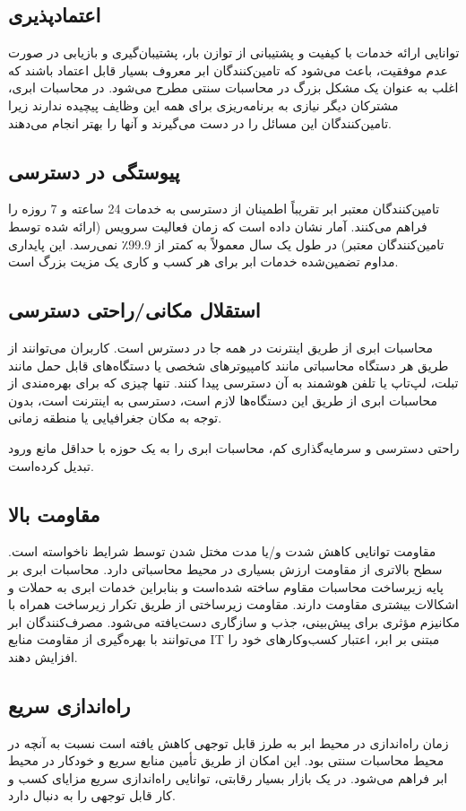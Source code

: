 \documentclass{book}
\begin{document}
    \subsection{اعتماد‌پذیری}
    توانایی ارائه خدمات با کیفیت و پشتیبانی از توازن بار، پشتیبان‌گیری و بازیابی در صورت عدم موفقیت، باعث می‌شود که تامین‌کنندگان ابر معروف بسیار قابل اعتماد باشند که اغلب به عنوان یک مشکل بزرگ در محاسبات سنتی مطرح می‌شود. در محاسبات ابری، مشترکان دیگر نیازی به برنامه‌ریزی برای همه این وظایف پیچیده ندارند زیرا تامین‌کنندگان این مسائل را در دست می‌گیرند و آنها را بهتر انجام می‌دهند.

    \subsection{پیوستگی در دسترسی}
    تامین‌کنندگان معتبر ابر تقریباً اطمینان از دسترسی به خدمات 24 ساعته و 7 روزه را فراهم می‌کنند. آمار نشان داده است که زمان فعالیت سرویس (ارائه شده توسط تامین‌کنندگان معتبر) در طول یک سال معمولاً به کمتر از 99.9٪ نمی‌رسد. این پایداری مداوم تضمین‌شده خدمات ابر برای هر کسب و کاری یک مزیت بزرگ است.

    \subsection{استقلال مکانی/راحتی دسترسی}
    محاسبات ابری از طریق اینترنت در همه جا در دسترس است. کاربران می‌توانند از طریق هر دستگاه محاسباتی مانند کامپیوترهای شخصی یا دستگاه‌های قابل حمل مانند تبلت، لپ‌تاپ یا تلفن هوشمند به آن دسترسی پیدا کنند. تنها چیزی که برای بهره‌مندی از محاسبات ابری از طریق این دستگاه‌ها لازم است، دسترسی به اینترنت است، بدون توجه به مکان جغرافیایی یا منطقه زمانی.

    راحتی دسترسی و سرمایه‌گذاری کم، محاسبات ابری را به یک حوزه با حداقل مانع ورود تبدیل کرده‌است.

    \subsection{مقاومت بالا}
    مقاومت توانایی کاهش شدت و/یا مدت مختل شدن توسط شرایط ناخواسته است. سطح بالاتری از مقاومت ارزش بسیاری در محیط محاسباتی دارد. محاسبات ابری بر پایه زیرساخت محاسبات مقاوم ساخته شده‌است و بنابراین خدمات ابری به حملات و اشکالات بیشتری مقاومت دارند. مقاومت زیرساختی از طریق تکرار زیرساخت همراه با مکانیزم مؤثری برای پیش‌بینی، جذب و سازگاری دست‌یافته می‌شود. مصرف‌کنندگان ابر می‌توانند با بهره‌گیری از مقاومت منابع IT مبتنی بر ابر، اعتبار کسب‌وکارهای خود را افزایش دهند.

    \subsection{راه‌اندازی سریع}
    زمان راه‌اندازی در محیط ابر به طرز قابل توجهی کاهش یافته است نسبت به آنچه در محیط محاسبات سنتی بود. این امکان از طریق تأمین منابع سریع و خودکار در محیط ابر فراهم می‌شود. در یک بازار بسیار رقابتی، توانایی راه‌اندازی سریع مزایای کسب و کار قابل توجهی را به دنبال دارد.
\end{document}
